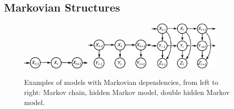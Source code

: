
\subsection{Markovian Structures}

\begin{figure}[H]
\centering
\includegraphics[width=0.3\textwidth,valign=t]{fig/temporal-simple.pdf}\hspace{5mm}\includegraphics[width=0.3\textwidth,valign=t]{fig/temporal-hmm.pdf}\hspace{5mm}\includegraphics[width=0.3\textwidth,valign=t]{fig/temporal2layer.pdf}
\caption{Examples of models with Markovian dependencies, from left to right: Markov chain, hidden Markov model, double hidden Markov model.\label{fig:markov-examples}}
\end{figure}

\vspace{3mm}

